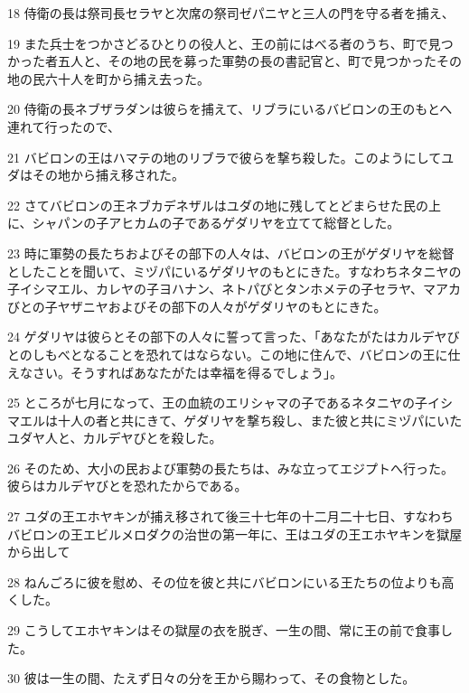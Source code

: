\par 18 侍衛の長は祭司長セラヤと次席の祭司ゼパニヤと三人の門を守る者を捕え、
\par 19 また兵士をつかさどるひとりの役人と、王の前にはべる者のうち、町で見つかった者五人と、その地の民を募った軍勢の長の書記官と、町で見つかったその地の民六十人を町から捕え去った。
\par 20 侍衛の長ネブザラダンは彼らを捕えて、リブラにいるバビロンの王のもとへ連れて行ったので、
\par 21 バビロンの王はハマテの地のリブラで彼らを撃ち殺した。このようにしてユダはその地から捕え移された。
\par 22 さてバビロンの王ネブカデネザルはユダの地に残してとどまらせた民の上に、シャパンの子アヒカムの子であるゲダリヤを立てて総督とした。
\par 23 時に軍勢の長たちおよびその部下の人々は、バビロンの王がゲダリヤを総督としたことを聞いて、ミヅパにいるゲダリヤのもとにきた。すなわちネタニヤの子イシマエル、カレヤの子ヨハナン、ネトパびとタンホメテの子セラヤ、マアカびとの子ヤザニヤおよびその部下の人々がゲダリヤのもとにきた。
\par 24 ゲダリヤは彼らとその部下の人々に誓って言った、「あなたがたはカルデヤびとのしもべとなることを恐れてはならない。この地に住んで、バビロンの王に仕えなさい。そうすればあなたがたは幸福を得るでしょう」。
\par 25 ところが七月になって、王の血統のエリシャマの子であるネタニヤの子イシマエルは十人の者と共にきて、ゲダリヤを撃ち殺し、また彼と共にミヅパにいたユダヤ人と、カルデヤびとを殺した。
\par 26 そのため、大小の民および軍勢の長たちは、みな立ってエジプトへ行った。彼らはカルデヤびとを恐れたからである。
\par 27 ユダの王エホヤキンが捕え移されて後三十七年の十二月二十七日、すなわちバビロンの王エビルメロダクの治世の第一年に、王はユダの王エホヤキンを獄屋から出して
\par 28 ねんごろに彼を慰め、その位を彼と共にバビロンにいる王たちの位よりも高くした。
\par 29 こうしてエホヤキンはその獄屋の衣を脱ぎ、一生の間、常に王の前で食事した。
\par 30 彼は一生の間、たえず日々の分を王から賜わって、その食物とした。


